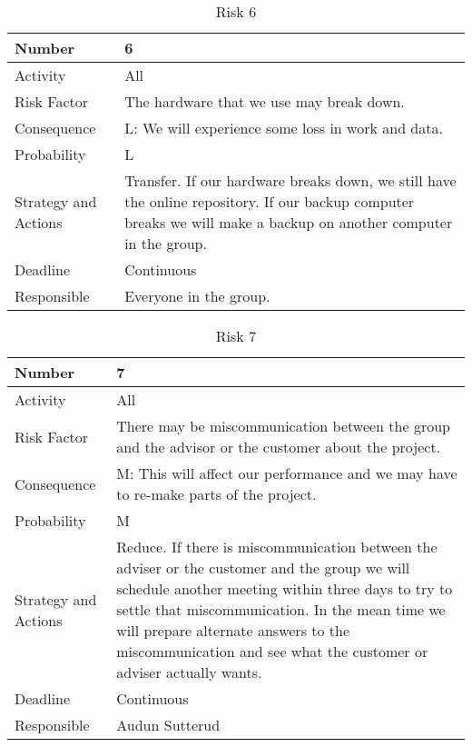 \documentclass[../document.tex]{subfiles}
\begin{document}
\begin{table}[H]
\caption{Risk 6}
\begin{tabularx}{\textwidth}{|l|X|}
\hline
Number
&6
\\ \hline Activity
&All
\\ \hline Risk Factor
&The hardware that we use may break down.
\\ \hline Consequence
&L: We will experience some loss in work and data.
\\ \hline Probability
&L
\\ \hline Strategy and Actions
&Transfer. If our hardware breaks down, we still have the online repository. If our backup computer breaks we will make a backup on another computer in the group.
\\ \hline Deadline
&Continuous
\\ \hline Responsible
&Everyone in the group.
\\ \hline 
\end{tabularx}
\end{table}

\begin{table}[H]
\caption{Risk 7}
\begin{tabularx}{\textwidth}{|l|X|}
\hline
Number
&7
\\ \hline Activity
&All
\\ \hline Risk Factor
&There may be miscommunication between the group and the advisor or the customer about the project.
\\ \hline Consequence
&M: This will affect our performance and we may have to re-make parts of the project.
\\ \hline Probability
&M
\\ \hline Strategy and Actions
&Reduce. If there is miscommunication between the adviser or the customer and the group we will schedule another meeting within three days to try to settle that miscommunication. In the mean time we will prepare alternate answers to the miscommunication and see what the customer or adviser actually wants.
\\ \hline Deadline
&Continuous
\\ \hline Responsible
&Audun Sutterud
\\ \hline 
\end{tabularx}
\end{table}
\end{document}

